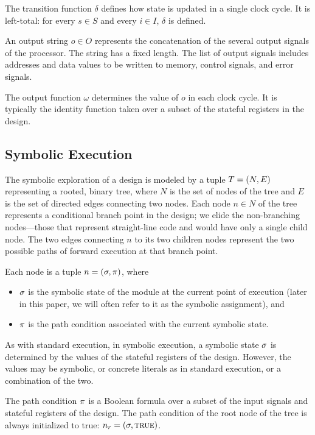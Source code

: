 The transition function $\delta$ defines how state is updated in a single clock
cycle. It is left-total: for every $s \in S$ and every $i \in I$, $\delta$ is defined.

An output string $o \in O$ represents the concatenation of the several output
signals of the processor. The string has a fixed length. The list of output
signals includes addresses and data values to be written to memory, control
signals, and error signals.

The output function $\omega$ determines the value of $o$ in each clock cycle. It
is typically the identity function taken over a subset of the stateful registers
in the design.

\subsection{Symbolic Execution}


The symbolic exploration of a design is modeled by a tuple $T = (N,E)$ representing a rooted, binary tree, where
$N$ is the set of nodes of the tree and $E$ is the set of directed edges connecting
two nodes. Each node $n \in N$ of the tree represents a conditional branch point in the
design; we elide the non-branching nodes---those that represent
straight-line code and would have only a single child node. The two edges connecting $n$ to its two children nodes represent the two
possible paths of forward execution at that branch point.

Each node is a tuple $n = (\sigma, \pi)$, where
\begin{itemize}
\item $\sigma$ is the symbolic state of the module at the current point of
  execution (later in this paper, we will often refer to it as the symbolic assignment), and
\item $\pi$ is the path condition associated with the current
  symbolic state.
\end{itemize}


As with standard execution, in symbolic execution, a symbolic state $\sigma$
is determined by the values of the stateful registers of the design. However,
the values may be symbolic, or
concrete literals as in standard execution, or a combination of the two.

The path condition $\pi$ is a Boolean formula over a subset of the input signals and
stateful registers of the design. The path condition of the root node of the
tree is always initialized to true: $n_r = (\sigma, \mathtt{\textsc{true}})$.


